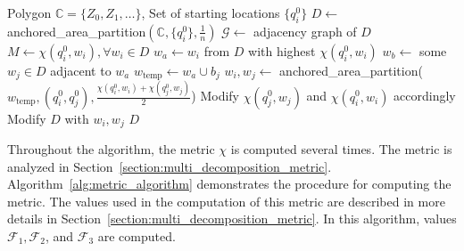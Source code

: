 \documentclass[../main.tex]{subfiles}
\begin{document}
\begin{algorithm}
	\caption{$\text{optimization\_procedure}(\mathbb{C}, \{q^0_i\})$}
	\label{alg:optimization_procedure}
	\begin{algorithmic}[1]
		\REQUIRE Polygon $\mathbb{C}=\{Z_0,Z_1,\ldots\}$, Set of starting locations $\{q^0_i\}$
			\STATE $D\gets$ anchored\_area\_partition$(\mathbb{C},\{q^0_i\},\frac{1}{n})$ \label{line:area_part}
			\STATE $\mathcal{G}\gets$ adjacency graph of $D$
			\STATE $M\gets\chi(q^0_i,w_i), \forall w_i\in D$ 
			\REPEAT
				\STATE $w_a\gets w_i$ from $D$ with highest $\chi(q^0_i,w_i)$
				\STATE $w_b\gets$ some $w_j\in D$ adjacent to $w_a$
				\STATE $w_{\text{temp}}\gets w_a\cup b_j$
				\STATE $w_i,w_j\gets$ anchored\_area\_partition($w_{\text{temp}},(q^0_i,q^0_j),\frac{\chi(q^0_i,w_i)+\chi(q^0_j,w_j)}{2}$) \label{line:distr_opt_cut}
				\STATE Modify $\chi(q^0_j,w_j)$ and $\chi(q^0_i,w_i)$ accordingly
				\STATE Modify $D$ with $w_i,w_j$
			\RETURN $D$
	\end{algorithmic}
\end{algorithm}

Throughout the algorithm, the metric $\chi$ is computed several times. The metric is analyzed in Section~\ref{section:multi_decomposition_metric}. Algorithm~\ref{alg:metric_algorithm} demonstrates the procedure for computing the metric. The values used in the computation of this metric are described in more details in Section~\ref{section:multi_decomposition_metric}. In this algorithm, values $\mathcal{F}_1,\mathcal{F}_2$, and $\mathcal{F}_3$ are computed. 
\end{document}
